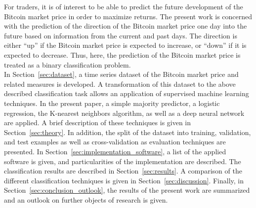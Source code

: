 For traders, it is of interest to be able to predict the future development of the Bitcoin market price in order to maximize returns.
The present work is concerned with the prediction of the direction of the Bitcoin market price one day into the future based on information from the current and past days. The direction is either \enquote{up} if the Bitcoin market price is expected to increase, or \enquote{down} if it is expected to decrease. Thus, here, the prediction of the Bitcoin market price is treated as a binary classification problem.\\

In Section~\ref{sec:dataset}, a time series dataset of the Bitcoin market price and related measures is developed. A transformation of this dataset to the above described classification task allows an application of supervised machine learning techniques. In the present paper, a simple majority predictor, a logistic regression, the K-nearest neighbors algorithm, as well as a deep neural network are applied. A brief description of these techniques is given in Section~\ref{sec:theory}. In addition, the split of the dataset into training, validation, and test examples as well as cross-validation as evaluation techniques are presented. In Section~\ref{sec:implementation_software}, a list of the applied software is given, and particularities of the implementation are described. The classification results are described in Section~\ref{sec:results}. A comparison of the different classification techniques is given in Section~\ref{sec:discussion}. Finally, in Section~\ref{sec:conclusion_outlook}, the results of the present work are summarized and an outlook on further objects of research is given.